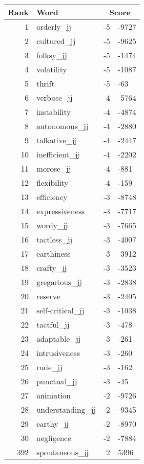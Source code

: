 \begin{longtable}[!htbp]{| rlr@{.}l |}
    \hline
    \textbf{Rank} & \textbf{Word} & \multicolumn{2}{c|}{\textbf{Score}} \\
    \hline
    \endhead
    1 & orderly\_jj & -5 & -9727 \\
    2 & cultured\_jj & -5 & -9625 \\
    3 & folksy\_jj & -5 & -1474 \\
    4 & volatility & -5 & -1087 \\
    5 & thrift & -5 & -63 \\
    6 & verbose\_jj & -4 & -5764 \\
    7 & instability & -4 & -4874 \\
    8 & autonomous\_jj & -4 & -2880 \\
    9 & talkative\_jj & -4 & -2447 \\
    10 & inefficient\_jj & -4 & -2202 \\
    11 & morose\_jj & -4 & -881 \\
    12 & flexibility & -4 & -159 \\
    13 & efficiency & -3 & -8748 \\
    14 & expressiveness & -3 & -7717 \\
    15 & wordy\_jj & -3 & -7665 \\
    16 & tactless\_jj & -3 & -4007 \\
    17 & earthiness & -3 & -3912 \\
    18 & crafty\_jj & -3 & -3523 \\
    19 & gregarious\_jj & -3 & -2838 \\
    20 & reserve & -3 & -2405 \\
    21 & self-critical\_jj & -3 & -1038 \\
    22 & tactful\_jj & -3 & -478 \\
    23 & adaptable\_jj & -3 & -261 \\
    24 & intrusiveness & -3 & -260 \\
    25 & rude\_jj & -3 & -162 \\
    26 & punctual\_jj & -3 & -45 \\
    27 & animation & -2 & -9726 \\
    28 & understanding\_jj & -2 & -9345 \\
    29 & earthy\_jj & -2 & -8970 \\
    30 & negligence & -2 & -7884 \\
    392 & spontaneous\_jj & 2 & 5396 \\

\end{longtable}
